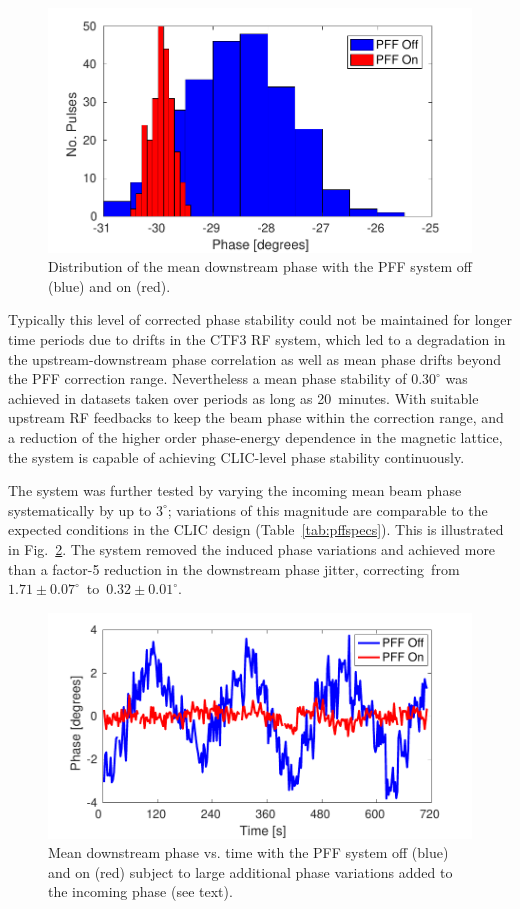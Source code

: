 \documentclass[%
 reprint,
 superscriptaddress,
 amsmath,
 amssymb,
 prl,
]{revtex4-1}
\begin{document}
\begin{figure}
	\includegraphics[width=\columnwidth]{figs/meanJit}
	\caption{\label{fig:meanJit}Distribution of the mean downstream phase with 
		the 
		PFF system off (blue) and on (red).}
\end{figure}

Typically this level of corrected phase stability could not be maintained for 
longer time periods due to drifts in the CTF3 RF system, which 
led to  a degradation in the upstream-downstream phase correlation as well as 
mean phase drifts beyond the PFF correction range. Nevertheless a mean phase 
stability of \(0.30^\circ\) was achieved in datasets taken over periods as long 
as 20~minutes. With suitable upstream RF feedbacks to keep the beam phase 
within the correction range, and a reduction of the higher order phase-energy 
dependence in the magnetic lattice, the system is capable of achieving 
CLIC-level phase stability continuously.

The system was further tested by varying the incoming mean 
beam phase systematically by up to \(3^\circ\); variations of this magnitude 
are comparable to the expected conditions in the CLIC design 
(Table~\ref{tab:pffspecs}). This is illustrated in Fig.~\ref{fig:wiggle}. The 
system removed the induced phase variations and achieved more than a factor-5 
reduction in the downstream phase jitter, 
correcting~from~\(1.71\pm0.07^\circ\)~to~\(0.32\pm0.01^\circ\). 

\begin{figure}
	\includegraphics[width=\columnwidth]{figs/wiggle}
	\caption{\label{fig:wiggle}Mean downstream phase vs. time with the PFF 
	system off (blue) and on (red) subject to large additional phase variations 
	added to the incoming phase (see text).}
\end{figure}
\end{document}
